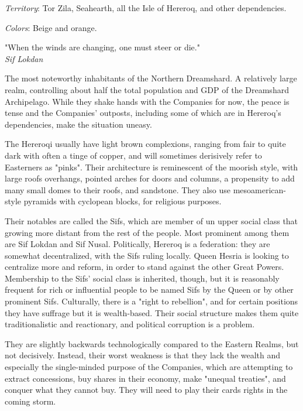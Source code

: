 \textit{Territory}: Tor Zila, Seahearth, all the Isle of Hereroq, and other dependencies.
    
\textit{Colors}: Beige and orange.


\begin{rpg-quotebox}
    "When the winds are changing, one must steer or die." \\ \textendash \textit{Sif Lokdan}
\end{rpg-quotebox}


The most noteworthy inhabitants of the Northern Dreamshard. A relatively large realm, controlling about half the total population and GDP of the Dreamshard Archipelago. While they shake hands with the Companies for now, the peace is tense and the Companies' outposts, including some of which are in Hereroq's dependencies, make the situation uneasy.

The Hereroqi usually have light brown complexions, ranging from fair to quite dark with often a tinge of copper, and will sometimes derisively refer to Easterners as "pinks". Their architecture is reminescent of the moorish style, with large roofs overhangs, pointed arches for doors and columns, a propensity to add many small domes to their roofs, and sandstone. They also use mesoamerican-style pyramids with cyclopean blocks, for religious purposes.

Their notables are called the Sifs, which are member of un upper social class that growing more distant from the rest of the people. Most prominent among them are Sif Lokdan and Sif Nusal. Politically, Hereroq is a federation: they are somewhat decentralized, with the Sifs ruling locally. Queen Hesria is looking to centralize more and reform, in order to stand against the other Great Powers. Membership to the Sifs' social class is inherited, though, but it is reasonably frequent for rich or influential people to be named Sifs by the Queen or by other prominent Sifs. Culturally, there is a "right to rebellion", and for certain positions they have suffrage but it is wealth-based. Their social structure makes them quite traditionalistic and reactionary, and political corruption is a problem. 

They are slightly backwards technologically compared to the Eastern Realms, but not decisively. Instead, their worst weakness is that they lack the wealth and especially the single-minded purpose of the Companies, which are attempting to extract concessions, buy shares in their economy, make "unequal treaties", and conquer what they cannot buy. They will need to play their cards rights in the coming storm. 

